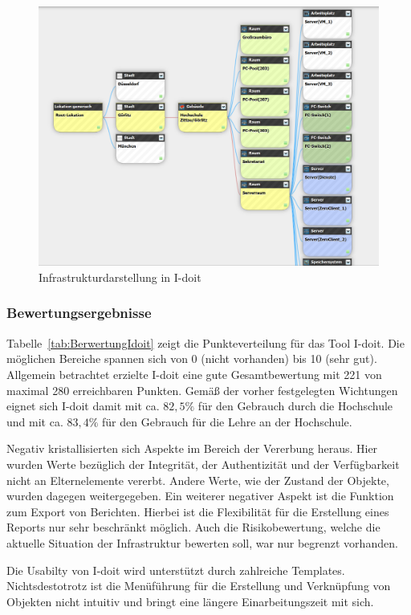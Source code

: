 \begin{figure}[htbp]
\includegraphics[width=\textwidth]{images/idoitschema}
\caption{Infrastrukturdarstellung in I-doit}
\label{fig:idoitschema}
\end{figure}


\subsubsection{Bewertungsergebnisse}
Tabelle~\ref{tab:BerwertungIdoit} zeigt die Punkteverteilung für das Tool I-doit. 
Die möglichen Bereiche spannen sich von 0 (nicht vorhanden) bis 10 (sehr gut).
Allgemein betrachtet erzielte I-doit eine gute Gesamtbewertung mit 221 von maximal 280 erreichbaren Punkten.
Gemäß der vorher festgelegten Wichtungen eignet sich I-doit damit mit ca. $82,5\%$ für den Gebrauch durch die Hochschule und mit ca. $83,4\%$ für den Gebrauch für die Lehre
an der Hochschule.

Negativ kristallisierten sich Aspekte im Bereich der Vererbung heraus. Hier wurden Werte bezüglich der Integrität, der Authentizität und der Verfügbarkeit nicht an Elternelemente vererbt. Andere Werte, wie der Zustand der Objekte, wurden dagegen weitergegeben.
Ein weiterer negativer Aspekt ist die Funktion zum Export von Berichten. Hierbei ist die Flexibilität für die Erstellung eines Reports nur sehr beschränkt möglich.
Auch die Risikobewertung, welche die aktuelle Situation der Infrastruktur bewerten soll, war nur begrenzt vorhanden. 

Die Usabilty von I-doit wird unterstützt durch zahlreiche Templates. Nichtsdestotrotz ist die Menüführung für die Erstellung und Verknüpfung von Objekten nicht intuitiv und bringt eine längere Einarbeitungszeit mit sich.

